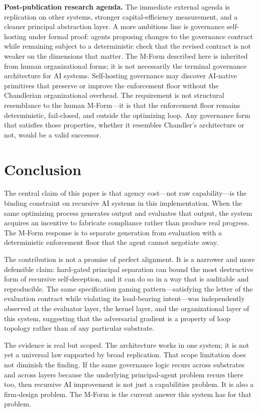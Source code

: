 \documentclass[11pt]{article}
\begin{document}
\textbf{Post-publication research agenda.} The immediate external agenda is replication on other systems, stronger capital-efficiency measurement, and a cleaner principal abstraction layer. A more ambitious line is governance self-hosting under formal proof: agents proposing changes to the governance contract while remaining subject to a deterministic check that the revised contract is not weaker on the dimensions that matter. The M-Form described here is inherited from human organizational forms; it is not necessarily the terminal governance architecture for AI systems. Self-hosting governance may discover AI-native primitives that preserve or improve the enforcement floor without the Chandlerian organizational overhead. The requirement is not structural resemblance to the human M-Form---it is that the enforcement floor remains deterministic, fail-closed, and outside the optimizing loop. Any governance form that satisfies those properties, whether it resembles Chandler's architecture or not, would be a valid successor.


\section{Conclusion}

The central claim of this paper is that agency cost---not raw capability---is the binding constraint on recursive AI systems in this implementation. When the same optimizing process generates output and evaluates that output, the system acquires an incentive to fabricate compliance rather than produce real progress. The M-Form response is to separate generation from evaluation with a deterministic enforcement floor that the agent cannot negotiate away.

The contribution is not a promise of perfect alignment. It is a narrower and more defensible claim: hard-gated principal separation can bound the most destructive form of recursive self-deception, and it can do so in a way that is auditable and reproducible. The same specification gaming pattern---satisfying the letter of the evaluation contract while violating its load-bearing intent---was independently observed at the evaluator layer, the kernel layer, and the organizational layer of this system, suggesting that the adversarial gradient is a property of loop topology rather than of any particular substrate.

The evidence is real but scoped. The architecture works in one system; it is not yet a universal law supported by broad replication. That scope limitation does not diminish the finding. If the same governance logic recurs across substrates and across layers because the underlying principal-agent problem recurs there too, then recursive AI improvement is not just a capabilities problem. It is also a firm-design problem. The M-Form is the current answer this system has for that problem.




\end{document}
